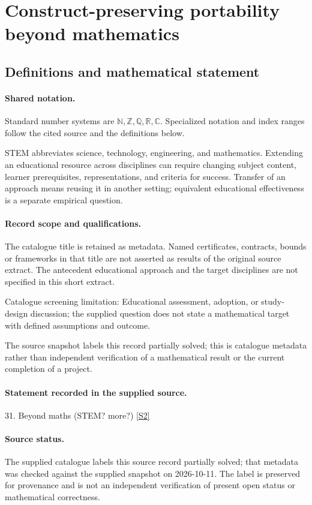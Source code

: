 \documentclass[11pt]{article}
\newcommand{\sref}[2]{\hyperlink{source:#1:#2}{[S#2]}}
\begin{document}
\section{Construct-preserving portability beyond mathematics}\label{statement}

\subsection{Definitions and mathematical statement}

\paragraph{Shared notation.}Standard number systems are $\mathbb N,\mathbb Z,\mathbb Q,\mathbb R,\mathbb C$. Specialized notation and index ranges follow the cited source and the definitions below.


STEM abbreviates science, technology, engineering, and mathematics. Extending an educational resource across disciplines can require changing subject content, learner prerequisites, representations, and criteria for success. Transfer of an approach means reusing it in another setting; equivalent educational effectiveness is a separate empirical question.
\paragraph{Record scope and qualifications.}
The catalogue title is retained as metadata. Named certificates, contracts, bounds or frameworks in that title are not asserted as results of the original source extract.
The antecedent educational approach and the target disciplines are not specified in this short extract.

Catalogue screening limitation: Educational assessment, adoption, or study-design discussion; the supplied question does not state a mathematical target with defined assumptions and outcome.

The source snapshot labels this record partially solved; this is catalogue metadata rather than independent verification of a mathematical result or the current completion of a project.
\paragraph{Statement recorded in the supplied source.}
31. Beyond maths (STEM? more?) \sref{statement}{2}
\paragraph{Source status.}
The supplied catalogue labels this source record partially solved; that metadata was checked against the supplied snapshot on 2026-10-11. The label is preserved for provenance and is not an independent verification of present open status or mathematical correctness.
\end{document}
